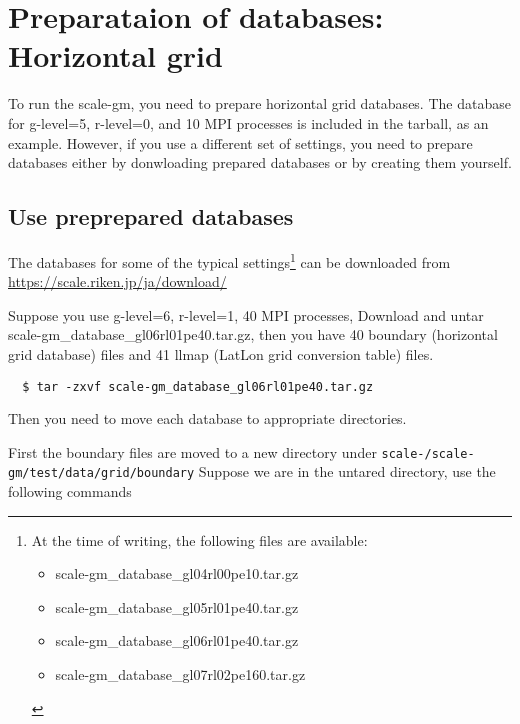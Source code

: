 \section{Preparataion of databases: Horizontal grid}

To run the scale-gm, you need to prepare horizontal grid databases.
The database for g-level=5, r-level=0, and 10 MPI processes
is included in the tarball, as an example.
However, if you use a different set of settings, you need to prepare databases
either by donwloading prepared databases or by creating them yourself.


\subsection{Use preprepared databases}
The databases for some of the typical settings\footnote{At the time of
  writing, the following files are available:
  \begin{itemize}
    \item scale-gm\_database\_gl04rl00pe10.tar.gz
    \item scale-gm\_database\_gl05rl01pe40.tar.gz
    \item scale-gm\_database\_gl06rl01pe40.tar.gz
    \item scale-gm\_database\_gl07rl02pe160.tar.gz
\end{itemize}} can be downloaded from \noindent \url{https://scale.riken.jp/ja/download/}

Suppose you use g-level=6, r-level=1, 40 MPI processes,
Download and untar scale-gm\_database\_gl06rl01pe40.tar.gz,
 then you have 40 boundary (horizontal grid database)
files and 41 llmap (LatLon
grid conversion table) files.
\begin{verbatim}
  $ tar -zxvf scale-gm_database_gl06rl01pe40.tar.gz
\end{verbatim}

\noindent Then you need to move each database to appropriate directories.

\noindent First the boundary files are moved to a new directory under
\texttt{scale-{\version}/scale-gm/test/data/grid/boundary}
Suppose we are in the untared directory, use the following commands
\\

